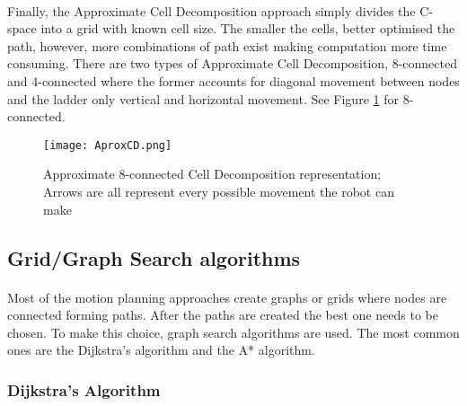 \paragraph{}Finally, the Approximate Cell Decomposition approach simply divides the C-space into a grid with known cell size. The smaller the cells, 
better optimised the path, however, more combinations of path exist making computation more time consuming. There are two types of Approximate Cell Decomposition, 
8-connected and 4-connected where the former accounts for diagonal movement between nodes and the ladder only vertical and horizontal movement. 
See Figure \ref{fig:ApproximateCellDecomposition} for 8-connected.
\begin{figure}[H]
    \centering
    \texttt{[image: AproxCD.png]}
    \caption{Approximate 8-connected Cell Decomposition representation; Arrows are all represent every possible movement the robot can make}
    \label{fig:ApproximateCellDecomposition}
\end{figure}
\subsection{Grid/Graph Search algorithms}
\label{subsec:GSA}
\paragraph{}Most of the motion planning approaches create graphs or grids where nodes are connected forming paths. After the paths
are created the best one needs to be chosen. To make this choice, graph search algorithms are used. The most common ones 
are the Dijkstra's algorithm and the A* algorithm.
\subsubsection{Dijkstra's Algorithm}
\label{subsubsec:Dijkstra}
